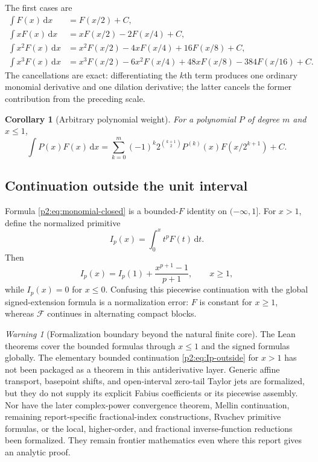 \documentclass[11pt,oneside]{article}
\newtheorem{corollary}[theorem]{Corollary}
\theoremstyle{definition}
\theoremstyle{remark}
\newtheorem{warning}[theorem]{Warning}
\newcommand{\dd}{\,\mathrm d}
\newcommand{\1}{\mathbf 1}
\begin{document}
The first cases are
\begin{align}
 \int F(x)\dd x
 &=F(x/2)+C,                                                \label{p2:eq:p0}\\
 \int xF(x)\dd x
 &=xF(x/2)-2F(x/4)+C,                                      \label{p2:eq:p1}\\
 \int x^2F(x)\dd x
 &=x^2F(x/2)-4xF(x/4)+16F(x/8)+C,                          \label{p2:eq:p2}\\
 \int x^3F(x)\dd x
 &=x^3F(x/2)-6x^2F(x/4)+48xF(x/8)-384F(x/16)+C.            \label{p2:eq:p3}
\end{align}
The cancellations are exact: differentiating the $k$th term produces one
ordinary monomial derivative and one dilation derivative; the latter cancels
the former contribution from the preceding scale.

\begin{corollary}[Arbitrary polynomial weight]
\label{p2:cor:polynomial}
For a polynomial $P$ of degree $m$ and $x\le1$,
\begin{equation}
 \boxed{
 \int P(x)F(x)\dd x=
 \sum_{k=0}^{m}(-1)^k2^{\binom{k+1}{2}}
 P^{(k)}(x)F(x/2^{k+1})+C.}                                \label{p2:eq:polynomial-closed}
\end{equation}
\end{corollary}

\subsection{Continuation outside the unit interval}
Formula \eqref{p2:eq:monomial-closed} is a bounded-$F$ identity on
$(-\infty,1]$.
For $x>1$, define the normalized primitive
\begin{equation}
 I_p(x)=\int_0^xt^pF(t)\dd t.                              \label{p2:eq:Ip-def-int}
\end{equation}
Then
\begin{equation}
 I_p(x)=I_p(1)+\frac{x^{p+1}-1}{p+1},\qquad x\ge1,         \label{p2:eq:Ip-outside}
\end{equation}
while $I_p(x)=0$ for $x\le0$.  Confusing this piecewise continuation with the
global signed-extension formula is a normalization error: $F$ is constant for
$x\ge1$, whereas $\mathcal F$ continues in alternating compact blocks.

\begin{warning}[Formalization boundary beyond the natural finite core]
The Lean theorems cover the bounded formulas through $x\le1$ and the signed
formulas globally.  The elementary bounded continuation
\eqref{p2:eq:Ip-outside} for $x>1$ has not been packaged as a theorem in this
antiderivative layer.  Generic affine transport, basepoint shifts, and
open-interval zero-tail Taylor jets are formalized, but they do not supply its
explicit Fabius coefficients or its piecewise assembly.  Nor have the later complex-power convergence theorem,
Mellin continuation, remaining report-specific fractional-index constructions, Rvachev primitive
formulas, or the local, higher-order, and fractional inverse-function reductions
been formalized.  They remain
frontier mathematics even where this report gives an analytic proof.
\end{warning}
\end{document}
